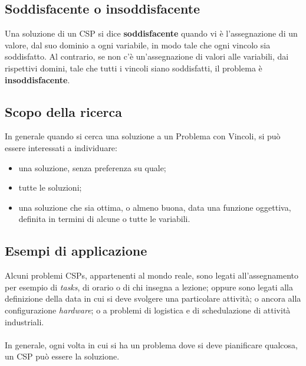 \subsection{Soddisfacente o insoddisfacente}
Una soluzione di un CSP si dice \textbf{soddisfacente} quando vi \`e l'assegnazione di un valore, dal suo dominio a ogni variabile, in modo tale che ogni vincolo sia soddisfatto. Al contrario, se non c'\`e un'assegnazione di valori alle variabili, dai rispettivi domini, tale che tutti i vincoli siano soddisfatti, il problema \`e \textbf{insoddisfacente}. 

\subsection{Scopo della ricerca}
In generale quando si cerca una soluzione a un Problema con Vincoli, si pu\`o essere interessati a individuare:
\begin{itemize}
\item una soluzione, senza preferenza su quale;
\item tutte le soluzioni;
\item una soluzione che sia ottima, o almeno buona, data una funzione oggettiva, definita in termini di alcune o tutte le variabili.
\end{itemize}

\subsection{Esempi di applicazione}
Alcuni problemi CSPs, appartenenti al mondo reale, sono legati all'assegnamento per esempio di \textit{tasks}, di orario o di chi insegna a lezione; oppure sono legati alla definizione della data in cui si deve svolgere una particolare attivit\`a; o ancora alla configurazione \textit{hardware}; o a problemi di logistica e di schedulazione di attivit\`a industriali.\\
\\ In generale, ogni volta in cui si ha un problema dove si deve pianificare qualcosa, un CSP pu\`o essere la soluzione.


